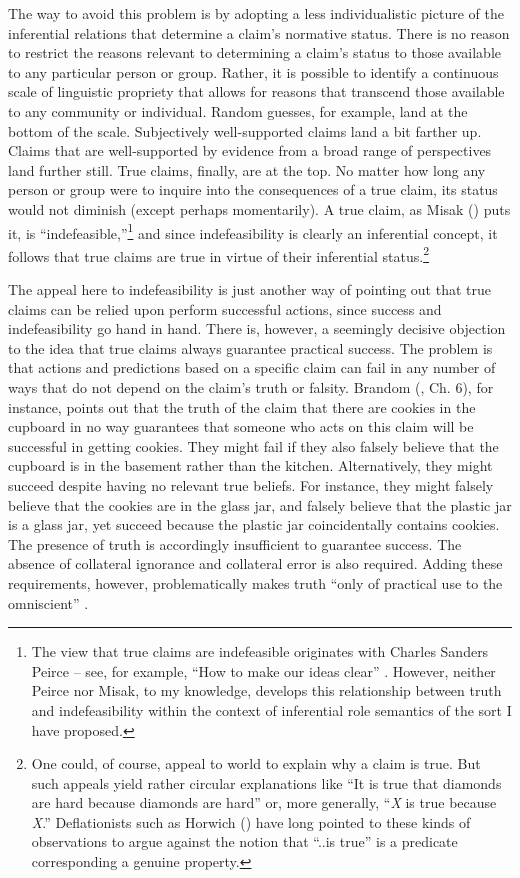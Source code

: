The way to avoid this problem is by adopting a less individualistic picture of the inferential relations that determine a claim's normative status. There is no reason to restrict the reasons relevant to determining a claim's status to those available to any particular person or group. Rather, it is possible to identify a continuous scale of linguistic propriety that allows for reasons that transcend those available to any community or individual. Random guesses, for example, land at the bottom of the scale. Subjectively well-supported claims land a bit farther up. Claims that are well-supported by evidence from a broad range of perspectives land further still. True claims, finally, are at the top. No matter how long any person or group were to inquire into the consequences of a true claim, its status would not diminish (except perhaps momentarily). A true claim, as Misak (\citeyear{Misak:2013}) puts it, is ``indefeasible,''\footnote{The view that true claims are indefeasible originates with Charles Sanders Peirce -- see, for example, ``How to make our ideas clear'' \citep{Peirce:1992}. However, neither Peirce nor Misak, to my knowledge, develops this relationship between truth and indefeasibility within the context of inferential role semantics of the sort I have proposed.} and since indefeasibility is clearly an inferential concept, it follows that true claims are true in virtue of their inferential status.\footnote{One could, of course, appeal to world to explain why a claim is true. But such appeals yield rather circular explanations like ``It is true that diamonds are hard because diamonds are hard'' or, more generally, ``\textit{X} is true because \textit{X}.'' Deflationists such as Horwich (\citeyear{Horwich:2005}) have long pointed to these kinds of observations to argue against the notion that ``..is true'' is a predicate corresponding a genuine property.}

The appeal here to indefeasibility is just another way of pointing out that true claims can be relied upon perform successful actions, since success and indefeasibility go hand in hand. There is, however, a seemingly decisive objection to the idea that true claims always guarantee practical success. The problem is that actions and predictions based on a specific claim can fail in any number of ways that do not depend on the claim's truth or falsity. Brandom (\citeyear{Brandom:1994b,Brandom:2009}, Ch. 6), for instance, points out that the truth of the claim that there are cookies in the cupboard in no way guarantees that someone who acts on this claim will be successful in getting cookies. They might fail if they also falsely believe that the cupboard is in the basement rather than the kitchen. Alternatively, they might succeed despite having no relevant true beliefs. For instance, they might falsely believe that the cookies are in the glass jar, and falsely believe that the plastic jar is a glass jar, yet succeed because the plastic jar coincidentally contains cookies. The presence of truth is accordingly insufficient to guarantee success. The absence of collateral ignorance and collateral error is also required. Adding these requirements, however, problematically makes truth ``only of practical use to the omniscient'' \citep[][p. 161]{Brandom:2009}. 

